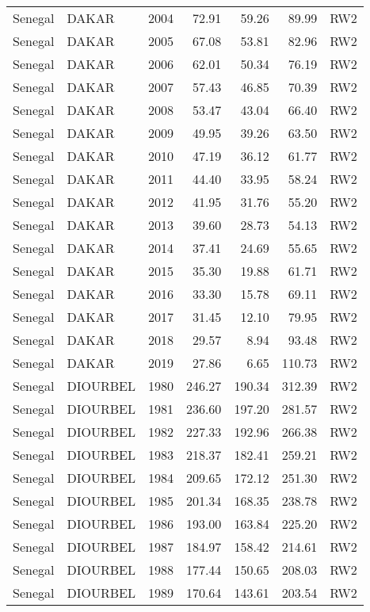 \begin{longtable}{lllrrrl}
  Senegal & DAKAR & 2004 & 72.91 & 59.26 & 89.99 & RW2 \\ 
  Senegal & DAKAR & 2005 & 67.08 & 53.81 & 82.96 & RW2 \\ 
  Senegal & DAKAR & 2006 & 62.01 & 50.34 & 76.19 & RW2 \\ 
  Senegal & DAKAR & 2007 & 57.43 & 46.85 & 70.39 & RW2 \\ 
  Senegal & DAKAR & 2008 & 53.47 & 43.04 & 66.40 & RW2 \\ 
  Senegal & DAKAR & 2009 & 49.95 & 39.26 & 63.50 & RW2 \\ 
  Senegal & DAKAR & 2010 & 47.19 & 36.12 & 61.77 & RW2 \\ 
  Senegal & DAKAR & 2011 & 44.40 & 33.95 & 58.24 & RW2 \\ 
  Senegal & DAKAR & 2012 & 41.95 & 31.76 & 55.20 & RW2 \\ 
  Senegal & DAKAR & 2013 & 39.60 & 28.73 & 54.13 & RW2 \\ 
  Senegal & DAKAR & 2014 & 37.41 & 24.69 & 55.65 & RW2 \\ 
  Senegal & DAKAR & 2015 & 35.30 & 19.88 & 61.71 & RW2 \\ 
  Senegal & DAKAR & 2016 & 33.30 & 15.78 & 69.11 & RW2 \\ 
  Senegal & DAKAR & 2017 & 31.45 & 12.10 & 79.95 & RW2 \\ 
  Senegal & DAKAR & 2018 & 29.57 & 8.94 & 93.48 & RW2 \\ 
  Senegal & DAKAR & 2019 & 27.86 & 6.65 & 110.73 & RW2 \\ 
  Senegal & DIOURBEL & 1980 & 246.27 & 190.34 & 312.39 & RW2 \\ 
  Senegal & DIOURBEL & 1981 & 236.60 & 197.20 & 281.57 & RW2 \\ 
  Senegal & DIOURBEL & 1982 & 227.33 & 192.96 & 266.38 & RW2 \\ 
  Senegal & DIOURBEL & 1983 & 218.37 & 182.41 & 259.21 & RW2 \\ 
  Senegal & DIOURBEL & 1984 & 209.65 & 172.12 & 251.30 & RW2 \\ 
  Senegal & DIOURBEL & 1985 & 201.34 & 168.35 & 238.78 & RW2 \\ 
  Senegal & DIOURBEL & 1986 & 193.00 & 163.84 & 225.20 & RW2 \\ 
  Senegal & DIOURBEL & 1987 & 184.97 & 158.42 & 214.61 & RW2 \\ 
  Senegal & DIOURBEL & 1988 & 177.44 & 150.65 & 208.03 & RW2 \\ 
  Senegal & DIOURBEL & 1989 & 170.64 & 143.61 & 203.54 & RW2 \\ 

\end{longtable}
